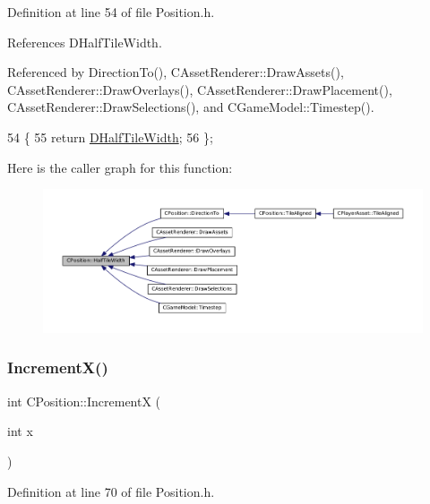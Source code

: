 Definition at line 54 of file Position.\+h.



References D\+Half\+Tile\+Width.



Referenced by Direction\+To(), C\+Asset\+Renderer\+::\+Draw\+Assets(), C\+Asset\+Renderer\+::\+Draw\+Overlays(), C\+Asset\+Renderer\+::\+Draw\+Placement(), C\+Asset\+Renderer\+::\+Draw\+Selections(), and C\+Game\+Model\+::\+Timestep().


\begin{DoxyCode}
54                                   \{
55             \textcolor{keywordflow}{return} \hyperlink{classCPosition_a3227e835d9008346e9d91bdad2380f14}{DHalfTileWidth};  
56         \};
\end{DoxyCode}
Here is the caller graph for this function\+:\nopagebreak
\begin{figure}[H]
\begin{center}
\leavevmode
\includegraphics[width=350pt]{classCPosition_a4b799a0fb78ddd8bbd8548980e2458af_icgraph}
\end{center}
\end{figure}
\hypertarget{classCPosition_aa5955d67d5ab7ca74d80cb7303b6eaa9}{}\label{classCPosition_aa5955d67d5ab7ca74d80cb7303b6eaa9} 
\subsubsection{\texorpdfstring{Increment\+X()}{IncrementX()}}
{\footnotesize\ttfamily int C\+Position\+::\+IncrementX (\begin{DoxyParamCaption}\item[{int}]{x }\end{DoxyParamCaption})\hspace{0.3cm}{\ttfamily [inline]}}



Definition at line 70 of file Position.\+h.



